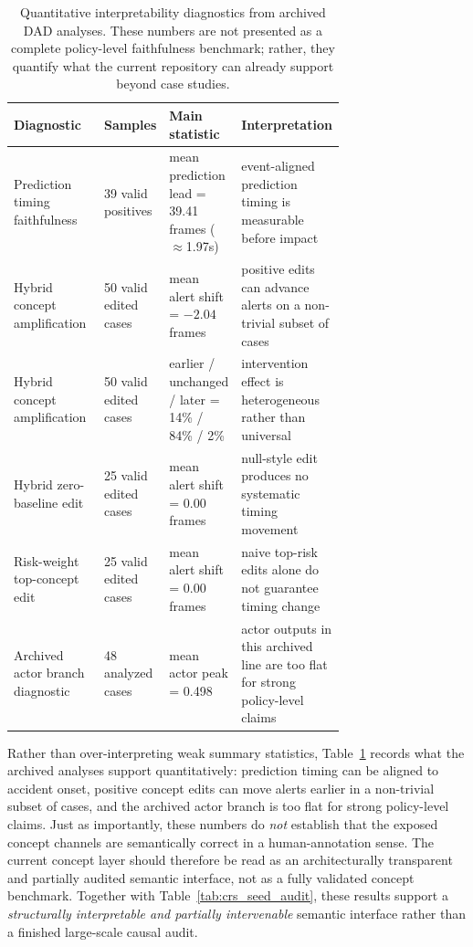 \begin{table}[t]
\caption{Quantitative interpretability diagnostics from archived DAD analyses. These numbers are not presented as a complete policy-level faithfulness benchmark; rather, they quantify what the current repository can already support beyond case studies.}
\label{tab:interp_quant}
\centering\small
\begin{tabular}{p{0.28\linewidth}p{0.16\linewidth}p{0.14\linewidth}p{0.14\linewidth}}
\toprule
Diagnostic & Samples & Main statistic & Interpretation \\
\midrule
Prediction timing faithfulness & 39 valid positives & mean prediction lead = 39.41 frames ($\approx$1.97s) & event-aligned prediction timing is measurable before impact \\
Hybrid concept amplification & 50 valid edited cases & mean alert shift = $-2.04$ frames & positive edits can advance alerts on a non-trivial subset of cases \\
Hybrid concept amplification & 50 valid edited cases & earlier / unchanged / later = 14\% / 84\% / 2\% & intervention effect is heterogeneous rather than universal \\
Hybrid zero-baseline edit & 25 valid edited cases & mean alert shift = 0.00 frames & null-style edit produces no systematic timing movement \\
Risk-weight top-concept edit & 25 valid edited cases & mean alert shift = 0.00 frames & naive top-risk edits alone do not guarantee timing change \\
Archived actor branch diagnostic & 48 analyzed cases & mean actor peak = 0.498 & actor outputs in this archived line are too flat for strong policy-level claims \\
\bottomrule
\end{tabular}
\end{table}

Rather than over-interpreting weak summary statistics, Table~\ref{tab:interp_quant}
records what the archived analyses support quantitatively: prediction timing
can be aligned to accident onset, positive concept edits can move alerts
earlier in a non-trivial subset of cases, and the archived actor branch is too
flat for strong policy-level claims. Just as importantly, these numbers do
\emph{not} establish that the exposed concept channels are semantically correct
in a human-annotation sense. The current concept layer should therefore be read
as an architecturally transparent and partially audited semantic interface,
not as a fully validated concept benchmark. Together with
Table~\ref{tab:crs_seed_audit}, these results support a \emph{structurally
interpretable and partially intervenable} semantic interface rather than a
finished large-scale causal audit.

